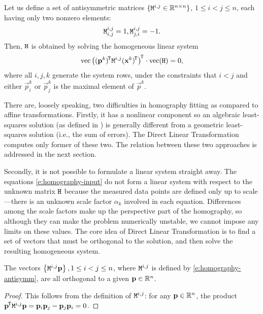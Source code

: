Let us define a set of antisymmetric matrices $\{\mathtt{M}^{i, j} \in \mathbb{R}^{n \times n}\}$, $1 \leq i < j \leq n$, each having only two nonzero elements:
\begin{equation} \label{e:homography-antisymm}
\mathtt{M}^{i, j}_{i, j} = 1,
\mathtt{M}^{i, j}_{j, i} = -1.
\end{equation}
Then, $\mathtt{H}$ is obtained by solving the homogeneous linear system
\begin{equation} \label{e:homography-system}
\mathrm{vec} \left(({\mathbf{p}}^k)^{\!\mathsf{T}} \mathtt{M}^{i, j} ({\mathbf{x}}^k)^{\!\mathsf{T}} \right)^{\!\mathsf{T}} \cdot \mathrm{vec}(\mathtt{H}) = 0,
\end{equation}
where all $i, j, k$ generate the system rows, under the constraints that $i < j$ and either $\vec p^k_i$ or $\vec p^k_j$ is the maximal element of $\vec p^k$.

There are, loosely speaking, two difficulties in homography fitting as compared to affine transformations.
Firstly, it has a nonlinear component so an algebraic least-squares solution (as defined in \cite[p.93]{hartley03}) is generally different from a geometric least-squares solution (i.e., the sum of errors).
The Direct Linear Transformation computes only former of these two.
The relation between these two approaches is addressed in the next section.

Secondly, it is not possible to formulate a linear system straight away.
The equations \eqref{e:homography-input} do not form a linear system with respect to the unknown matrix $\mathtt{H}$ because the measured data points are defined only up to scale---there is an unknown scale factor $\alpha_k$ involved in each equation.
Differences among the scale factors make up the perspective part of the homography, so although they can make the problem numerically unstable, we cannot impose any limits on these values.
The core idea of Direct Linear Transformation is to find a set of vectors that must be orthogonal to the solution, and then solve the resulting homogeneous system.

\begin{lemma} \label{l:homography-orthogonal}
The vectors $\left\{ \mathtt{M}^{i, j} \mathbf{p} \right\}, 1 \leq i < j \leq n$, where $\mathtt{M}^{i,j}$ is defined by \eqref{e:homography-antisymm}, are all orthogonal to a given $\mathbf{p} \in \mathbb{R}^n$.
\end{lemma}
\begin{proof}
This follows from the definition of $\mathtt{M}^{i,j}$: for any $\mathbf{p} \in \mathbb{R}^n$, the product $\mathbf{p}^{\!\mathsf{T}} \mathtt{M}^{i, j} \mathbf{p} = \mathbf{p}_{i} \mathbf{p}_{j} - \mathbf{p}_{j} \mathbf{p}_{i} = 0$.
\end{proof}

